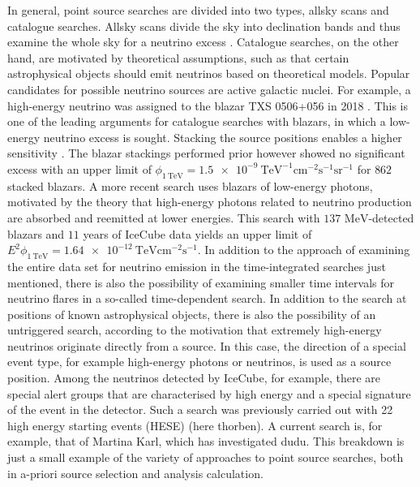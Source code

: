 In general, point source searches are divided into two types, allsky scans and catalogue searches.
Allsky scans divide the sky into declination bands and thus examine the whole sky for a neutrino excess \cite{all_sky_paper}.
Catalogue searches, on the other hand, are motivated by theoretical assumptions, such as that certain astrophysical objects should emit neutrinos based on theoretical models.
Popular candidates for possible neutrino sources are active galactic nuclei.
For example, a high-energy neutrino was assigned to the blazar TXS 0506+056 in 2018 \cite{txs}.
This is one of the leading arguments for catalogue searches with blazars, in which a low-energy neutrino excess is sought.
Stacking the source positions enables a higher sensitivity \cite{stacking_argument}.
The blazar stackings performed prior however \cite{blazar_stacking_2017} showed no significant excess with an upper limit of $\phi_{\SI{1}{\tera\electronvolt}}=\SI{1.5e-9}{\tera\electronvolt\tothe{-1}\centi\meter\tothe{-2}\second\tothe{-1}\steradian\tothe{-1}}$ for $\num{862}$ stacked blazars.
A more recent search \cite{blazar_stacking_2020} uses blazars of low-energy photons, motivated by the theory that high-energy photons related to neutrino production are absorbed and reemitted at lower energies.
This search with $\num{137}$ $\si{\mega\electronvolt}$-detected blazars and $\num{11}$ years of IceCube data yields an upper limit of $E^2\phi_{\SI{1}{\tera\electronvolt}}=\SI{1.64e-12}{\tera\electronvolt\centi\meter\tothe{-2}\second\tothe{-1}}$.
In addition to the approach of examining the entire data set for neutrino emission in the time-integrated searches just mentioned, there is also the possibility of examining smaller time intervals for neutrino flares in a so-called time-dependent search.
In addition to the search at positions of known astrophysical objects, there is also the possibility of an untriggered search, according to the motivation that extremely high-energy neutrinos originate directly from a source.
In this case, the direction of a special event type, for example high-energy photons or neutrinos, is used as a source position.
Among the neutrinos detected by IceCube, for example, there are special alert groups that are characterised by high energy and a special signature of the event in the detector.
Such a search was previously carried out with 22 high energy starting events (HESE) (here thorben).
A current search is, for example, that of Martina Karl, which has investigated dudu.
This breakdown is just a small example of the variety of approaches to point source searches, both in a-priori source selection and analysis calculation.

